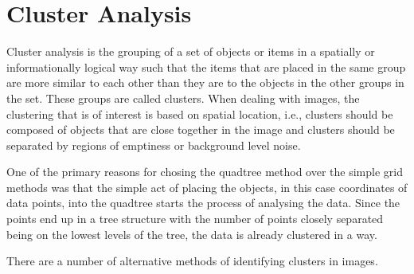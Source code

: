 
\section{Cluster Analysis}
\label{sec:cluster_analysis}

Cluster analysis is the grouping of a set of objects or items in a spatially or
informationally logical way such that the items that are placed in the same
group are more similar to each other than they are to the objects in the other
groups in the set. These groups are called clusters. When dealing with images,
the clustering that is of interest is based on spatial location, i.e., clusters
should be composed of objects that are close together in the image and clusters
should be separated by regions of emptiness or background level noise.

One of the primary reasons for chosing the quadtree method over the simple grid
methods was that the simple act of placing the objects, in this case
coordinates of data points, into the quadtree starts the process of analysing
the data. Since the points end up in a tree structure with the number of points
closely separated being on the lowest levels of the tree, the data is already
clustered in a way.

There are a number of alternative methods of identifying clusters in images.


